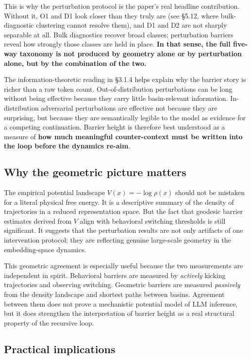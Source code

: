 \documentclass{article}
\theoremstyle{plain}
\theoremstyle{definition}
\begin{document}
This is why the perturbation protocol is the paper's real headline
contribution. Without it, O1 and D1 look closer than they truly are
(see §5.12, where bulk-diagnostic clustering cannot resolve them),
and D1 and D2 are not sharply separable at all. Bulk diagnostics
recover broad classes; perturbation barriers reveal how strongly
those classes are held in place. \textbf{In that sense, the full five-way
taxonomy is not produced by geometry alone or by perturbation alone,
but by the combination of the two.}

The information-theoretic reading in §3.1.4 helps explain why the
barrier story is richer than a raw token count. Out-of-distribution
perturbations can be long without being effective because they carry
little basin-relevant information. In-distribution adversarial
perturbations are effective not because they are surprising, but
because they are semantically legible to the model as evidence for a
competing continuation. Barrier height is therefore best understood
as a measure of \textbf{how much meaningful counter-context must be
written into the loop before the dynamics re-aim}.

\subsection{Why the geometric picture matters}

The empirical potential landscape $V(x) = -\log \rho(x)$ should not
be mistaken for a literal physical free energy. It is a descriptive
summary of the density of trajectories in a reduced representation
space. But the fact that geodesic barrier estimates derived from $V$
align with behavioral switching thresholds is still significant. It
suggests that the perturbation results are not only artifacts of one
intervention protocol; they are reflecting genuine large-scale
geometry in the embedding-space dynamics.

This geometric agreement is especially useful because the two
measurements are independent in spirit. Behavioral barriers are
measured by \textit{actively} kicking trajectories and observing switching.
Geometric barriers are measured \textit{passively} from the density
landscape and shortest paths between basins. Agreement between them
does not prove a mechanistic potential model of LLM inference, but
it does strengthen the interpretation of barrier height as a real
structural property of the recursive loop.

\subsection{Practical implications}
\end{document}
